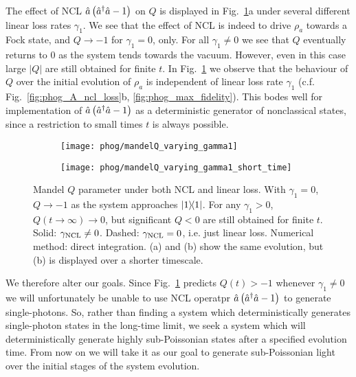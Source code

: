 The effect of NCL $\hat{a}\left(\hat{a}^\dagger \hat{a} - 1\right)$ on $Q$ is displayed in Fig.~\ref{fig:phog_ncl_Q}a under several different linear loss rates $\gamma_1$. We see that the effect of NCL is indeed to drive $\rho_a$ towards a Fock state, and $Q \rightarrow -1$ for $\gamma_1 = 0$, only. For all $\gamma_1 \ne 0$ we see that $Q$ eventually returns to $0$ as the system tends towards the vacuum. However, even in this case large $\left|Q\right|$ are still obtained for finite $t$. In Fig.~\ref{fig:phog_ncl_Q} we observe that the behaviour of $Q$ over the initial evolution of $\rho_a$ is independent of linear loss rate $\gamma_1$ (c.f. Fig.~\ref{fig:phog_A_ncl_loss}b, \ref{fig:phog_max_fidelity}). This bodes well for implementation of $\hat{a}\left(\hat{a}^\dagger \hat{a} - 1\right)$ as a deterministic generator of nonclassical states, since a restriction to small times $t$ is always possible.

\begin{figure}[htp]
\captionsetup{width=0.8\linewidth}
\centering
	\begin{subfigure}{0.7\linewidth}
	\caption{}
	\texttt{[image: phog/mandelQ\_varying\_gamma1]}
	\end{subfigure}
	\begin{subfigure}{0.7\linewidth}
	\caption{}
	\texttt{[image: phog/mandelQ\_varying\_gamma1\_short\_time]}
	\end{subfigure}
\caption{\label{fig:phog_ncl_Q} Mandel $Q$ parameter under both NCL and linear loss. With $\gamma_1=0$, $Q \rightarrow -1$ as the system approaches $\dyad{1}$. For any $\gamma_1 > 0$, $Q\left(t\rightarrow\infty\right) \rightarrow 0$, but significant $Q < 0$ are still obtained for finite $t$. Solid: $\gamma_{\text{NCL}} \ne 0$. Dashed: $\gamma_{\text{NCL}} = 0$, i.e. just linear loss. Numerical method: direct integration. (a) and (b) show the same evolution, but (b) is displayed over a shorter timescale.}
\end{figure}

We therefore alter our goals. Since Fig.~\ref{fig:phog_ncl_Q} predicts $Q\left(t\right) > -1$ whenever $\gamma_1 \ne 0$ we will unfortunately be unable to use NCL operatpr $\hat{a}\left(\hat{a}^\dagger \hat{a} - 1\right)$ to generate single-photons. So, rather than finding a system which deterministically generates single-photon states in the long-time limit, we seek a system which will deterministically generate highly sub-Poissonian states after a specified evolution time. From now on we will take it as our goal to generate sub-Poissonian light over the initial stages of the system evolution.

